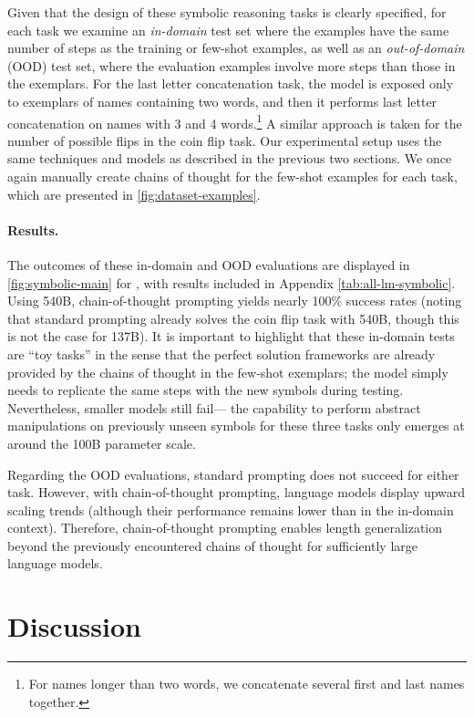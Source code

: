 Given that the design of these symbolic reasoning tasks is clearly specified, for each task we examine an \textit{in-domain} test set where the examples have the same number of steps as the training or few-shot examples, as well as an \textit{out-of-domain} (OOD) test set, where the evaluation examples involve more steps than those in the exemplars. For the last letter concatenation task, the model is exposed only to exemplars of names containing two words, and then it performs last letter concatenation on names with 3 and 4 words.\footnote{For names longer than two words, we concatenate several first and last names together.} A similar approach is taken for the number of possible flips in the coin flip task. Our experimental setup uses the same techniques and models as described in the previous two sections. We once again manually create chains of thought for the few-shot examples for each task, which are presented in \cref{fig:dataset-examples}.

\paragraph{Results.} 
The outcomes of these in-domain and OOD evaluations are displayed in \cref{fig:symbolic-main} for \palm{}, with \lamda{} results included in Appendix \cref{tab:all-lm-symbolic}. Using \palm{} 540B, chain-of-thought prompting yields nearly 100\% success rates (noting that standard prompting already solves the coin flip task with \palm{} 540B, though this is not the case for \lamda{} 137B). It is important to highlight that these in-domain tests are ``toy tasks'' in the sense that the perfect solution frameworks are already provided by the chains of thought in the few-shot exemplars; the model simply needs to replicate the same steps with the new symbols during testing. Nevertheless, smaller models still fail— the capability to perform abstract manipulations on previously unseen symbols for these three tasks only emerges at around the 100B parameter scale.

Regarding the OOD evaluations, standard prompting does not succeed for either task. However, with chain-of-thought prompting, language models display upward scaling trends (although their performance remains lower than in the in-domain context). Therefore, chain-of-thought prompting enables length generalization beyond the previously encountered chains of thought for sufficiently large language models.

\section{Discussion}\label{sec:discussion}

